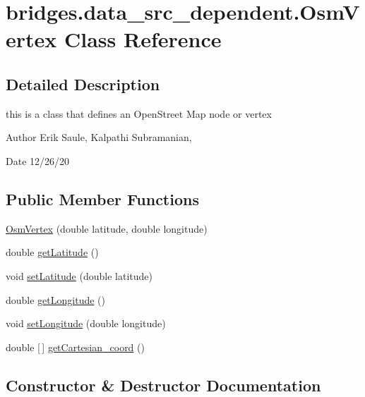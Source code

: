 \hypertarget{classbridges_1_1data__src__dependent_1_1_osm_vertex}{}\section{bridges.\+data\+\_\+src\+\_\+dependent.\+Osm\+Vertex Class Reference}
\label{classbridges_1_1data__src__dependent_1_1_osm_vertex}


\subsection{Detailed Description}
this is a class that defines an Open\+Street Map node or vertex 

\begin{DoxyAuthor}{Author}
Erik Saule, Kalpathi Subramanian, 
\end{DoxyAuthor}
\begin{DoxyDate}{Date}
12/26/20 
\end{DoxyDate}
\subsection*{Public Member Functions}
\begin{DoxyCompactItemize}
\item 
\hyperlink{classbridges_1_1data__src__dependent_1_1_osm_vertex_aa95185eb1ced2e59ebf3cf9cb64773ed}{Osm\+Vertex} (double latitude, double longitude)
\item 
double \hyperlink{classbridges_1_1data__src__dependent_1_1_osm_vertex_a6da7cbbd1f3d686af9974d5769d4a245}{get\+Latitude} ()
\item 
void \hyperlink{classbridges_1_1data__src__dependent_1_1_osm_vertex_afda8504609680c855ea81f0c679298e9}{set\+Latitude} (double latitude)
\item 
double \hyperlink{classbridges_1_1data__src__dependent_1_1_osm_vertex_a73ce32c2897be14aa893822ce4081f3d}{get\+Longitude} ()
\item 
void \hyperlink{classbridges_1_1data__src__dependent_1_1_osm_vertex_a2b4ac472641b5b206cff7db53ce3285b}{set\+Longitude} (double longitude)
\item 
double \mbox{[}$\,$\mbox{]} \hyperlink{classbridges_1_1data__src__dependent_1_1_osm_vertex_ab0921714d93d0fc416657e39a90c404e}{get\+Cartesian\+\_\+coord} ()
\end{DoxyCompactItemize}


\subsection{Constructor \& Destructor Documentation}
\mbox{\label{classbridges_1_1data__src__dependent_1_1_osm_vertex_aa95185eb1ced2e59ebf3cf9cb64773ed}} 
